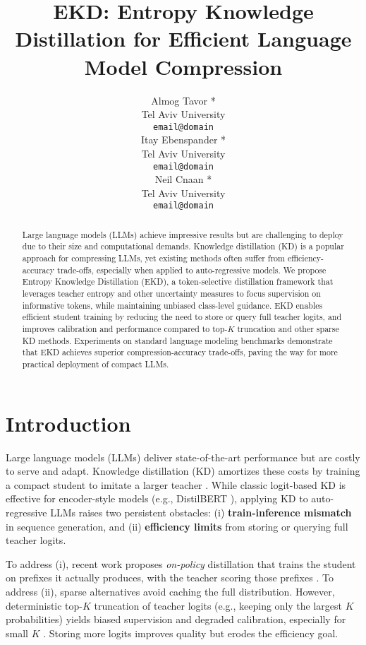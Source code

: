 \documentclass[11pt]{article}
\title{EKD: Entropy Knowledge Distillation for Efficient Language Model Compression}
\author{Almog Tavor *\\
  Tel Aviv University \\
  \texttt{email@domain} \\\And
  Itay Ebenspander *\\
  Tel Aviv University \\
  \texttt{email@domain} \\\And
  Neil Cnaan *\\
  Tel Aviv University \\
  \texttt{email@domain} \\
  }
\begin{document}
\maketitle
\let\thefootnote\relax{}
\begin{abstract}
Large language models (LLMs) achieve impressive results but are challenging to deploy due to their size and computational demands. Knowledge distillation (KD) is a popular approach for compressing LLMs, yet existing methods often suffer from efficiency-accuracy trade-offs, especially when applied to auto-regressive models. We propose Entropy Knowledge Distillation (EKD), a token-selective distillation framework that leverages teacher entropy and other uncertainty measures to focus supervision on informative tokens, while maintaining unbiased class-level guidance. EKD enables efficient student training by reducing the need to store or query full teacher logits, and improves calibration and performance compared to top-$K$ truncation and other sparse KD methods. Experiments on standard language modeling benchmarks demonstrate that EKD achieves superior compression-accuracy trade-offs, paving the way for more practical deployment of compact LLMs.
\end{abstract}

\section{Introduction}

Large language models (LLMs) deliver state-of-the-art performance but are costly to serve and adapt. Knowledge distillation (KD) amortizes these costs by training a compact student to imitate a larger teacher \citep{hinton2015distillation}. While classic logit-based KD is effective for encoder-style models (e.g., DistilBERT \citep{sanh2019distilbert}), applying KD to auto-regressive LLMs raises two persistent obstacles: (i) \textbf{train-inference mismatch} in sequence generation, and (ii) \textbf{efficiency limits} from storing or querying full teacher logits.

To address (i), recent work proposes \emph{on-policy} distillation that trains the student on prefixes it actually produces, with the teacher scoring those prefixes \citep{agarwal2024gkd}. To address (ii), sparse alternatives avoid caching the full distribution. However, deterministic top-$K$ truncation of teacher logits (e.g., keeping only the largest $K$ probabilities) yields biased supervision and degraded calibration, especially for small $K$ \citep{anshumann2025sparse,shum2024first}. Storing more logits improves quality but erodes the efficiency goal.
\end{document}
